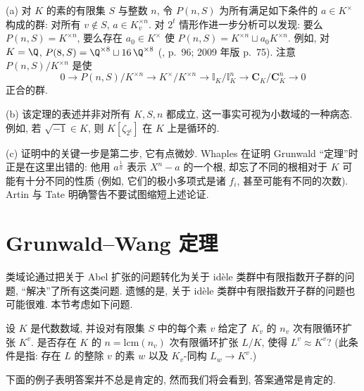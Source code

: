 \begin{remark}\label{rem:viii.1.5}
(a) 对 $K$ 的素的有限集 $S$ 与整数 $n$, 令 $P(n,S)$ 为所有满足如下条件的 $a\in K^{\times}$ 构成的群: 对所有 $v\notin S$, $a\in K_v^{\times n}$. 对 $2^{t}$ 情形作进一步分析可以发现: 要么 $P(n,S)=K^{\times n}$, 要么存在 $a_0\in K^{\times}$ 使 $P(n,S)=K^{\times n}\sqcup a_0K^{\times n}$. 例如, 对 $K=\Q$, $P(8,S)=\Q^{\times 8}\sqcup 16\,\Q^{\times 8}$ (\cite{ArtinTate1961}, p.~96; 2009 年版 p.~75). 注意 $P(n,S)/K^{\times n}$ 是使
\[
0\to P(n,S)/K^{\times n}\to K^{\times}/K^{\times n}\to\mathbb{I}_{K}/\mathbb{I}_{K}^{n}\to\mathbf{C}_{K}/\mathbf{C}_{K}^{n}\to0
\]
正合的群.

(b) 该定理的表述并非对所有 $K,S,n$ 都成立, 这一事实可视为小数域的一种病态. 例如, 若 $\sqrt{-1}\in K$, 则 $K[\zeta_{2^t}]$ 在 $K$ 上是循环的.

(c) 证明中的关键一步是第二步, 它有点微妙. Whaples 在证明 Grunwald ``定理''时正是在这里出错的: 他用 $a^{\frac{1}{n}}$ 表示 $X^{n}-a$ 的一个根, 却忘了不同的根相对于 $K$ 可能有十分不同的性质 (例如, 它们的极小多项式是诸 $f_i$, 甚至可能有不同的次数). Artin 与 Tate 明确警告不要试图缩短上述论证.
\end{remark}

\section{Grunwald--Wang 定理}\label{sec:VIII.2}

类域论通过把关于 Abel 扩张的问题转化为关于 idèle 类群中有限指数开子群的问题, ``解决''了所有这类问题. 遗憾的是, 关于 idèle 类群中有限指数开子群的问题也可能很难. 本节考虑如下问题.

\begin{question}\label{qu:viii.2.1}
设 $K$ 是代数数域, 并设对有限集 $S$ 中的每个素 $v$ 给定了 $K_v$ 的 $n_v$ 次有限循环扩张 $K^{v}$. 是否存在 $K$ 的 $n=\mathrm{lcm}(n_v)$ 次有限循环扩张 $L/K$, 使得 $L^{v}\approx K^{v}$? (此条件是指: 存在 $L$ 的整除 $v$ 的素 $w$ 以及 $K_v$-同构 $L_w\to K^{v}$.)
\end{question}

下面的例子表明答案并不总是肯定的, 然而我们将会看到, 答案通常是肯定的.

